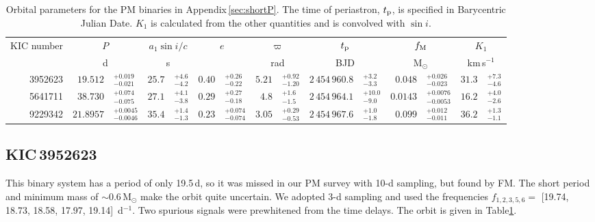 \documentclass[a4paper,fleqn,usenatbib]{mnras}
\begin{document}
\begin{table*}
\centering
\caption{Orbital parameters for the PM binaries in Appendix\,\ref{sec:shortP}. The time of periastron, $t_{\rm p}$, is specified in Barycentric Julian Date. $K_1$ is calculated from the other quantities and is convolved with $\sin i$.}
\label{tab:appendix_a_orbits}
\begin{tabular}{r r@{}l r@{}l r@{}l r@{}l r@{}l r@{}l r@{}l}
\toprule
\multicolumn{1}{c}{KIC number} & \multicolumn{2}{c}{$P$} & \multicolumn{2}{c}{$a_1 \sin i / c$} & \multicolumn{2}{c}{$e$} & \multicolumn{2}{c}{$\varpi$} & \multicolumn{2}{c}{$t_{\rm p}$} & \multicolumn{2}{c}{$f_{\rm M}$} & \multicolumn{2}{c}{$K_1$}\\
\multicolumn{1}{c}{} & \multicolumn{2}{c}{d} & \multicolumn{2}{c}{s} & \multicolumn{2}{c}{} & \multicolumn{2}{c}{rad} & \multicolumn{2}{c}{BJD} & \multicolumn{2}{c}{M$_{\odot}$} & \multicolumn{2}{c}{km\,s$^{-1}$}\\
\midrule
\vspace{1.5mm}
3952623 & $19.512$&$^{+0.019}_{-0.021}$ & $25.7$&$^{+4.6}_{-4.2}$ & $0.40$&$^{+0.26}_{-0.22}$ & $5.21$&$^{+0.92}_{-1.20}$ & $2\,454\,960.8$&$^{+3.2}_{-3.3}$ & $0.048$&$^{+0.026}_{-0.023}$ & $31.3$&$^{+7.3}_{-4.6}$\\
\vspace{1.5mm}
5641711 & $38.730$&$^{+0.074}_{-0.075}$ & $27.1$&$^{+4.1}_{-3.8}$ & $0.29$&$^{+0.27}_{-0.18}$ & $4.8$&$^{+1.6}_{-1.5}$ & $2\,454\,964.1$&$^{+10.0}_{-9.0}$ & $0.0143$&$^{+0.0076}_{-0.0053}$ & $16.2$&$^{+4.0}_{-2.6}$\\
\vspace{1.5mm}
9229342 & $21.8957$&$^{+0.0045}_{-0.0046}$ & $35.4$&$^{+1.4}_{-1.3}$ & $0.23$&$^{+0.074}_{-0.074}$ & $3.05$&$^{+0.29}_{-0.53}$ & $2\,454\,967.6$&$^{+1.0}_{-1.8}$ & $0.099$&$^{+0.012}_{-0.011}$ & $36.2$&$^{+1.3}_{-1.1}$\\
\bottomrule
\end{tabular}
\end{table*}


\subsection{KIC\,3952623} %

This binary system has a period of only 19.5\,d, so it was missed in our PM survey with 10-d sampling, but found by FM. The short period and minimum mass of $\sim$0.6\,M$_{\odot}$ make the orbit quite uncertain. We adopted 3-d sampling and used the frequencies $f_{1,2,3,5,6} =$ [19.74, 18.73, 18.58, 17.97, 19.14]~d$^{-1}$. Two spurious signals were prewhitened from the time delays. The orbit is given in Table\:\ref{tab:appendix_a_orbits}.
\end{document}
